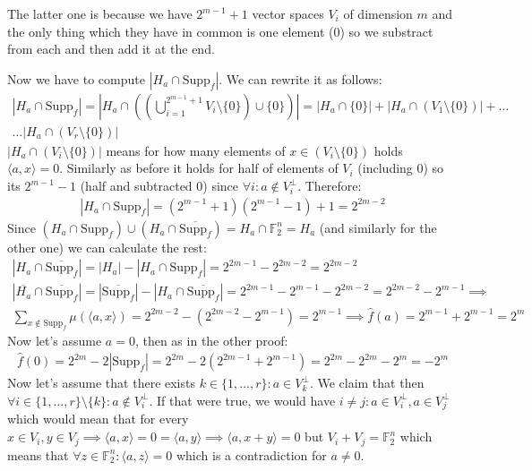\documentclass[12pt, a4paper]{article}
\begin{document}
The latter one is because we have $2^{m-1}+1$ vector spaces $V_i$ of dimension $m$ and the only thing which they have in common is one element (0) so we substract from each and then add it at the end.

Now we have to compute $|H_a \cap \text{Supp}_f|$. We can rewrite it as follows:
\begin{gather*}
|H_a \cap \text{Supp}_f| = |H_a \cap \left(\left(\bigcup_{i=1}^{2^{m-1}+1} V_i\setminus\{0\}\right) \cup \{0\}\right)| = |H_a \cap \{0\}| + |H_a \cap  (V_1\setminus\{0\})| + \dots \\
\dots |H_a \cap  (V_r\setminus\{0\})|
\end{gather*}
$|H_a \cap (V_i\setminus\{0\})|$ means for how many elements of $x \in (V_i\setminus\{0\})$ holds $\langle a,x \rangle = 0$. Similarly as before it holds for half of elements of $V_i$ (including 0) so its $2^{m-1}-1$ (half and subtracted 0) since $\forall i: a \notin V^\perp_i$. Therefore:
\begin{gather*}
|H_a \cap \text{Supp}_f| = (2^{m-1}+1)(2^{m-1}-1)+1 = 2^{2m-2}
\end{gather*}
Since $(H_a \cap \text{Supp}_f) \cup (H_a \cap \overline{\text{Supp}_f}) = H_a \cap \mathbb{F}_2^n = H_a$ (and similarly for the other one) we can calculate the rest:
\begin{gather*}
|H_a \cap \overline{\text{Supp}_f}| = |H_a|-|H_a \cap \text{Supp}_f| = 2^{2m-1} - 2^{2m-2} = 2^{2m-2}\\
|\overline{H_a} \cap \overline{\text{Supp}_f}| = |\overline{\text{Supp}_f}|-|H_a \cap \overline{\text{Supp}_f}| = 2^{2m-1}-2^{m-1}-2^{2m-2} = 2^{2m-2}-2^{m-1}\implies\\
\sum\limits_{x \notin \text{Supp}_f} \mu(\langle a,x \rangle) =  2^{2m-2} - (2^{2m-2}-2^{m-1}) = 2^{m-1} \implies \hat{f}(a) = 2^{m-1} + 2^{m-1} = 2^m
\end{gather*}
Now let's assume $a = 0$, then as in the other proof:
\begin{gather*}
\hat{f}(0) = 2^{2m}-2|\text{Supp}_f| = 2^{2m} - 2(2^{2m-1}+2^{m-1}) = 2^{2m} - 2^{2m}-2^{m} = -2^{m}
\end{gather*}
Now let's assume that there exists $k \in \{1,\dots,r\}: a \in V^\perp_k$. We claim that then $\forall i \in \{1,\dots,r\}\setminus\{k\}: a \notin V^\perp_i$. If that were true, we would have $i\neq j: a \in  V^\perp_i, a \in  V^\perp_j$ which would mean that for every $x \in V_i, y \in V_j \implies \langle a,x \rangle = 0 = \langle a,y \rangle \implies \langle a,x+y \rangle = 0$ but $V_i + V_j = \mathbb{F}_2^n$ which means that $\forall z \in \mathbb{F}_2^n: \langle a,z \rangle = 0$ which is a contradiction for $a \neq 0$.
\end{document}
